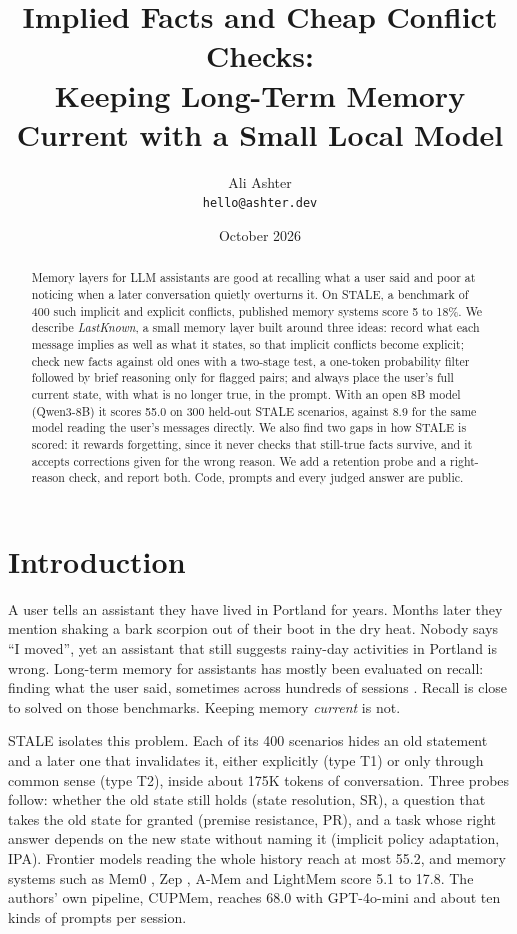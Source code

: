 \documentclass[10pt,twocolumn]{article}
\title{Implied Facts and Cheap Conflict Checks:\\Keeping Long-Term Memory Current with a Small Local Model}
\author{Ali Ashter\\\texttt{hello@ashter.dev}}
\date{October 2026}
\begin{document}
\maketitle

\begin{abstract}
Memory layers for LLM assistants are good at recalling what a user said and poor at noticing when a later
conversation quietly overturns it. On STALE, a benchmark of 400 such implicit and explicit conflicts, published
memory systems score 5 to 18\%. We describe \emph{LastKnown}, a small memory layer built around three ideas: record
what each message implies as well as what it states, so that implicit conflicts become explicit; check new facts
against old ones with a two-stage test, a one-token probability filter followed by brief reasoning only for flagged
pairs; and always place the user's full current state, with what is no longer true, in the prompt. With an open 8B
model (Qwen3-8B) it scores 55.0 on 300 held-out STALE scenarios, against 8.9 for the same model reading the user's
messages directly. We also find two gaps in how STALE is scored: it rewards forgetting, since it never checks that
still-true facts survive, and it accepts corrections given for the wrong reason. We add a retention probe and a
right-reason check, and report both. Code, prompts and every judged answer are public.
\end{abstract}

\section{Introduction}

A user tells an assistant they have lived in Portland for years. Months later they mention shaking a bark scorpion
out of their boot in the dry heat. Nobody says ``I moved'', yet an assistant that still suggests rainy-day
activities in Portland is wrong. Long-term memory for assistants has mostly been evaluated on recall: finding what the
user said, sometimes across hundreds of sessions \cite{locomo,longmemeval}. Recall is close to solved on those
benchmarks. Keeping memory \emph{current} is not.

STALE \cite{stale} isolates this problem. Each of its 400 scenarios hides an old statement and a later one that
invalidates it, either explicitly (type T1) or only through common sense (type T2), inside about 175K tokens of
conversation. Three probes follow: whether the old state still holds (state resolution, SR), a question that takes
the old state for granted (premise resistance, PR), and a task whose right answer depends on the new state without
naming it (implicit policy adaptation, IPA). Frontier models reading the whole history reach at most 55.2, and
memory systems such as Mem0 \cite{mem0}, Zep \cite{zep}, A-Mem \cite{amem} and LightMem score 5.1 to 17.8. The
authors' own pipeline, CUPMem, reaches 68.0 with GPT-4o-mini and about ten kinds of prompts per session.
\end{document}
